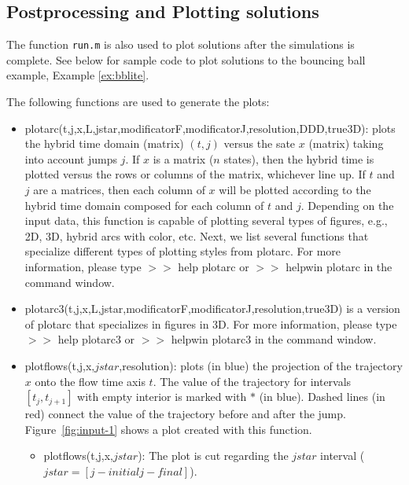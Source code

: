 \documentclass{article}
\begin{document}
% 
\label{scr:initialization}


\subsection{Postprocessing and Plotting solutions}\label{sec:plotfcn}

The function {\tt run.m} is also used to plot solutions after the simulations is complete. See below for sample code to plot solutions to the bouncing ball example, Example \ref{ex:bblite}.

% 
\label{scr:postprocesing}


\noindent The following functions are used to generate the plots:
\begin{itemize}
\item plotarc(t,j,x,L,jstar,modificatorF,modificatorJ,resolution,DDD,true3D): plots the hybrid time domain (matrix) $(t,j)$ versus the sate $x$  (matrix) taking into account jumps $j$. If $x$ is a matrix ($n$ states), then the hybrid time is plotted versus the rows or columns of the matrix, whichever line up. If $t$ and $j$ are a matrices, then each column of $x$ will be plotted according to the hybrid time domain composed for each column of $t$ and $j$. Depending on the input data, this function is capable of plotting several types of figures, e.g., 2D, 3D, hybrid arcs with color, etc. Next, we list several functions that specialize different types of plotting styles from plotarc. For more information, please type $>>$ help plotarc or $>>$ helpwin plotarc in the command window.
\item plotarc3(t,j,x,L,jstar,modificatorF,modificatorJ,resolution,true3D) is a version of plotarc that specializes in figures in 3D. For more information, please type $>>$ help plotarc3 or $>>$ helpwin plotarc3 in the command window.
\item plotflows(t,j,x,$jstar$,resolution): plots (in blue) the projection of the
  trajectory $x$ onto the flow time axis $t$.  The value of the
  trajectory for intervals $[t_j,t_{j+1}]$ with empty interior is
  marked with $*$ (in blue).  Dashed lines (in red) connect the value of the
  trajectory before and after the jump. 
  Figure~\ref{fig:input-1} shows a plot created with this function.
 \begin{itemize}
 	\item plotflows(t,j,x,$jstar$): The plot is cut regarding the $jstar$ interval ($jstar = [j-initial j-final]$).

\end{itemize}
\end{itemize}
\end{document}
